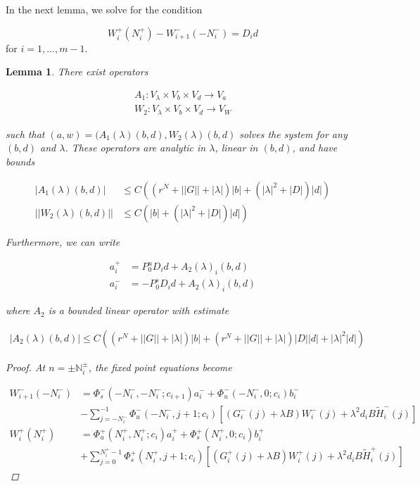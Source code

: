 \documentclass[12pt]{article}
\def\N{{\mathbb N}}
\newtheorem{lemma}{Lemma}
\begin{document}
In the next lemma, we solve for the condition

\[
W_i^+(N_i^+) - W_{i+1}^-(-N_i^-) = D_i d
\]
for $i = 1, \dots, m-1$. 


\begin{lemma}\label{inv2}
There exist operators 

\begin{align*}
A_1 : V_\lambda \times V_b \times V_d \rightarrow V_a \\
W_2 : V_\lambda \times V_b \times V_d \rightarrow V_W
\end{align*}

such that $(a, w) = (A_1(\lambda)(b,d), W_2(\lambda)(b,d)$ solves the system for any $(b, d)$ and $\lambda$. These operators are analytic in $\lambda$, linear in $(b,d)$, and have bounds 

\begin{align}
|A_1(\lambda)(b, d)| &\leq C \left( (r^N + ||G|| + |\lambda| ) |b| + (|\lambda|^2 + |D| ) |d| \right) \label{A1bound} \\
||W_2(\lambda)(b,d)|| &\leq C \left( |b| + (|\lambda|^2 + |D|) |d| \right) \label{W2bound}
\end{align}

Furthermore, we can write

\begin{align*}
a_i^+ &= P_0^u D_i d + A_2(\lambda)_i(b,d) \\
a_i^- &= -P_0^s D_i d + A_2(\lambda)_i(b,d)
\end{align*}

where $A_2$ is a bounded linear operator with estimate

\begin{align}\label{A2bound}
|A_2(\lambda)(b,d)| \leq 
C\left( (r^N + ||G|| + |\lambda| )|b| + (r^N + ||G|| + |\lambda|)|D||d| + |\lambda|^2 |d|  \right)
\end{align}

\begin{proof}
At $n = \pm \N_i^\pm$, the fixed point equations become

\begin{align*}
W_{i+1}^-(-N_i^-) &= 
\Phi_s^-(-N_i^-, -N_i^-; c_{i+1}) a_i^- + \Phi_u^-(-N_i^-, 0; c_i) b_i^- \\
&- \sum_{j = -N_i^-}^{-1} \Phi_u^-(-N_i^-, j+1; c_i) 
[(G_i^-(j) + \lambda B) W_i^-(j) + \lambda^2 d_i B \tilde{H}_i^-(j)] \\
W_i^+(N_i^+) &= \Phi_u^+(N_i^+, N_i^+; c_i) a_i^+ + \Phi_s^+(N_i^+, 0; c_i) b_i^+ \\
&+ \sum_{j = 0}^{N_i^+-1} \Phi_s^+(N_i^+, j+1; c_i) 
[(G_i^+(j) + \lambda B) W_i^+(j) + \lambda^2 d_i B \tilde{H}_i^+(j)]
\end{align*}


\end{proof}
\end{lemma}
\end{document}

